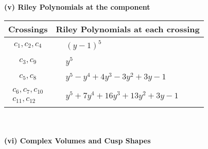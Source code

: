 \documentclass[1p]{elsarticle_modified}
\theoremstyle{definition}
\begin{document}
\newpage\renewcommand{\arraystretch}{1}
\flushleft \textbf{(v) Riley Polynomials at the component}\newline \\
\begin{tabular}{m{50pt}|m{274pt}}
Crossings & \hspace{64pt}Riley Polynomials at each crossing \\
\hline $$\begin{aligned}c_{1},c_{2},c_{4}\end{aligned}$$&$\begin{aligned}
&(y-1)^5
\end{aligned}$\\
\hline $$\begin{aligned}c_{3},c_{9}\end{aligned}$$&$\begin{aligned}
&y^5
\end{aligned}$\\
\hline $$\begin{aligned}c_{5},c_{8}\end{aligned}$$&$\begin{aligned}
&y^5- y^4+4 y^3-3 y^2+3 y-1
\end{aligned}$\\
\hline $$\begin{aligned}c_{6},c_{7},c_{10}\\c_{11},c_{12}\end{aligned}$$&$\begin{aligned}
&y^5+7 y^4+16 y^3+13 y^2+3 y-1
\end{aligned}$\\
\hline
\end{tabular}\\~\\
\newpage\flushleft \textbf{(vi) Complex Volumes and Cusp Shapes}
\end{document}
